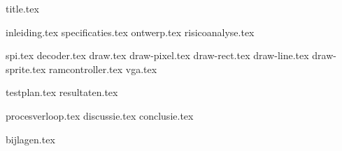 \documentclass[final]{scrreprt}
\begin{document}

{title.tex}

\newpage

\tableofcontents

\newpage
{}
{inleiding.tex}
{specificaties.tex}
{ontwerp.tex}
{risicoanalyse.tex}

{spi.tex}
{decoder.tex}
{draw.tex}
{draw-pixel.tex}
{draw-rect.tex}
{draw-line.tex}
{draw-sprite.tex}
{ramcontroller.tex}
{vga.tex}

{testplan.tex}
{resultaten.tex}

{procesverloop.tex}
{discussie.tex}
{conclusie.tex}


\newpage
{}

\printbibliography
{bijlagen.tex}
\end{document}
